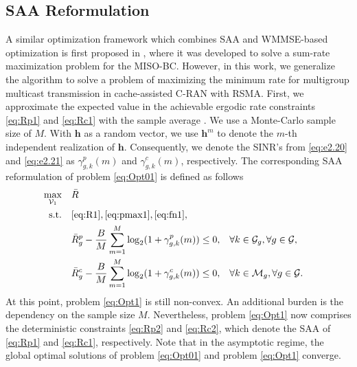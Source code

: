 \documentclass[12pt,draftcls,onecolumn]{IEEEtran}
\theoremstyle{remark}
\theoremstyle{definition}
\begin{document}
{\subsection{SAA Reformulation}
A similar optimization framework which combines SAA and WMMSE-based optimization is first proposed in \cite{7555358}, where it was developed to solve a sum-rate maximization problem for the MISO-BC. %
However, in this work, we generalize the algorithm to solve a problem of maximizing the minimum rate for multigroup multicast transmission in cache-assisted C-RAN with RSMA. First, we approximate the expected value in the achievable ergodic rate constraints \eqref{eq:Rp1} and \eqref{eq:Rc1} with the sample average \cite{saa}. We use a Monte-Carlo sample size of $M$. With $\mathbf{h}$ as a random vector, we use $\mathbf{h}^m$ to denote the $m$-th independent realization of $\mathbf{h}$. Consequently, we denote the SINR's from \eqref{eq:e2.20} and \eqref{eq:e2.21} as $\gamma_{g,k}^p(m)$ and $\gamma_{g,k}^c(m)$, respectively. The corresponding SAA reformulation of problem \eqref{eq:Opt01} is defined as follows
\begin{subequations}\label{eq:Opt1}
	\begin{align}
		\underset{\mathcal{V}_1}{\text{max}}\quad &\bar{R}  \\
		\text{s.t.} \quad & \eqref{eq:R1}, \eqref{eq:pmax1}, \eqref{eq:fn1}, \nonumber \\
		& \bar{R}_{g}^{p} - \frac{B}{M} \sum_{m=1}^{M} \log_2(1+\gamma_{g,k}^p(m)) \leq 0, &&\forall k \in \mathcal{G}_g, \forall g \in \mathcal{G}, \label{eq:Rp2}\\	
		& \bar{R}_{g}^{c} - \frac{B}{M} \sum_{m=1}^{M} \log_2(1+\gamma_{g,k}^c(m)) \leq 0, &&\forall k \in \mathcal{M}_g, \forall g \in \mathcal{G}. \label{eq:Rc2}
	\end{align}
\end{subequations} 
At this point, problem \eqref{eq:Opt1} is still non-convex. An additional burden is the dependency on the sample size $M$. Nevertheless, problem \eqref{eq:Opt1} now comprises the deterministic constraints \eqref{eq:Rp2} and \eqref{eq:Rc2}, which denote the SAA of \eqref{eq:Rp1} and \eqref{eq:Rc1}, respectively. Note that in the asymptotic regime, the global optimal solutions of problem \eqref{eq:Opt01} and problem \eqref{eq:Opt1} converge. %
}
\end{document}
